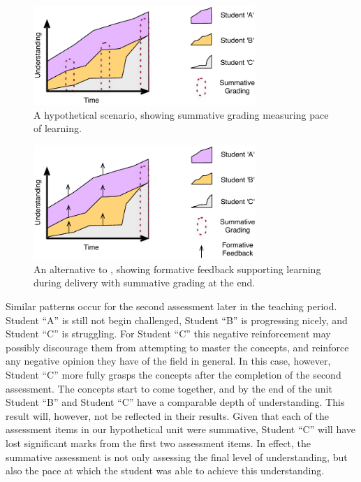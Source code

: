 \begin{figure}[p]
	\centering
	\includegraphics[width=0.75\textwidth]{PaceOfLearning}
	\caption{A hypothetical scenario, showing summative grading measuring pace of learning.}
	\label{fig:pace}
\end{figure}

\begin{figure}[p]
	\centering
	\includegraphics[width=0.75\textwidth]{FormativeFeedback}
	\caption{An alternative to , showing formative feedback supporting learning during delivery with summative grading at the end.}
	\label{fig:formative}
\end{figure}

Similar patterns occur for the second assessment later in the teaching period. Student ``A'' is still not begin challenged, Student ``B'' is progressing nicely, and Student ``C'' is struggling. For Student ``C'' this negative reinforcement may possibly discourage them from attempting to master the concepts, and reinforce any negative opinion they have of the field in general. In this case, however, Student ``C'' more fully grasps the concepts after the completion of the second assessment. The concepts start to come together, and by the end of the unit Student ``B'' and Student ``C'' have a comparable depth of understanding. This result will, however, not be reflected in their results. Given that each of the assessment items in our hypothetical unit were summative, Student ``C'' will have lost significant marks from the first two assessment items. In effect, the summative assessment is not only assessing the final level of understanding, but also the pace at which the student was able to achieve this understanding. 

